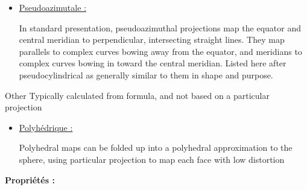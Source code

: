 \documentclass{article}
\begin{document}
\begin{itemize}
\begin{itemize}
        \end{itemize}
    \item \underline{Pseudoazimutale :}
        \begin{itemize} In standard presentation, pseudoazimuthal projections map the equator
        and central 
        meridian to perpendicular, intersecting straight lines. They map parallels to complex 
        curves bowing away from the equator, and meridians to complex curves bowing in toward 
        the central meridian. Listed here after pseudocylindrical as generally 
        similar to them in 
        shape and purpose.
        \end{itemize}
\end{itemize}

\vspace{1\baselineskip}

Other
Typically calculated from formula, and not based on a particular projection

\begin{itemize}
    \item \underline{Polyhédrique :}
        \begin{itemize} Polyhedral maps can be folded up into a polyhedral approximation to the sphere, using 
        particular projection to map each 
        face with low distortion
        \end{itemize}
\end{itemize}


\textbf{Propriétés :}
\end{document}
